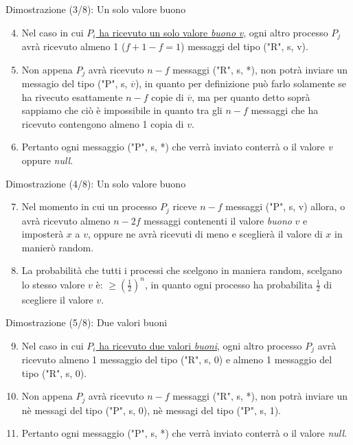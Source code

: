 \documentclass{beamer}
\begin{document}
\begin{frame}{Dimostrazione (3/8): Un solo valore buono}
    \begin{enumerate}
        \setcounter{enumi}{3}
        \item<1-> Nel caso in cui \underline{$P_{i}$ ha ricevuto un solo valore \textit{buono} \textit{v}}, ogni altro processo $P_{j}$ avrà ricevuto almeno 1 ($f + 1 - f = 1$) messaggi del tipo ("R", s, v).
        \item<2-> Non appena $P_{j}$ avrà ricevuto $n - f$ messaggi ("R", s, *), non potrà inviare un messagio del tipo ("P", s, $\overline{v}$), in quanto per definizione può farlo solamente se ha rivecuto esattamente $n - f$ copie di $\overline{v}$, ma per quanto detto soprà sappiamo che ciò è impossibile in quanto tra gli $n - f$ messaggi che ha ricevuto contengono almeno 1 copia di $v$.
        \item<3-> Pertanto ogni messaggio ("P", s, *) che verrà inviato conterrà o il valore \textit{v} oppure \textit{null}.
    \end{enumerate}
\end{frame}

\begin{frame}{Dimostrazione (4/8): Un solo valore buono}
    \begin{enumerate}
        \setcounter{enumi}{6}
        \item<1-> Nel momento in cui un processo $P_{j}$ riceve $n - f$ messaggi ("P", s, v) allora, o avrà ricevuto almeno $n - 2f$ messaggi contenenti il valore \textit{buono} $v$ e imposterà $x$ a $v$, oppure ne avrà ricevuti di meno e sceglierà il valore di $x$ in manierò random.
        \item<2-> La probabilità che tutti i processi che scelgono in maniera random, scelgano lo stesso valore $v$ è: $\geq (\frac{1}{2})^n$, in quanto ogni processo ha probabilita $\frac{1}{2}$ di scegliere il valore $v$.  
    \end{enumerate}
\end{frame}

\begin{frame}{Dimostrazione (5/8): Due valori buoni}
    \begin{enumerate}
        \setcounter{enumi}{8}
        \item<1-> Nel caso in cui \underline{$P_{i}$ ha ricevuto due valori \textit{buoni}}, ogni altro processo $P_{j}$ avrà ricevuto almeno 1 messaggio del tipo ("R", s, 0) e almeno 1 messaggio del tipo ("R", s, 0).
        \item<2-> Non appena $P_{j}$ avrà ricevuto $n - f$ messaggi ("R", s, *), non potrà inviare un nè messagi del tipo ("P", s, 0), nè messagi del tipo ("P", s, 1).
        \item<3-> Pertanto ogni messaggio ("P", s, *) che verrà inviato conterrà o il valore \textit{null}.
    \end{enumerate}
\end{frame}
\end{document}
